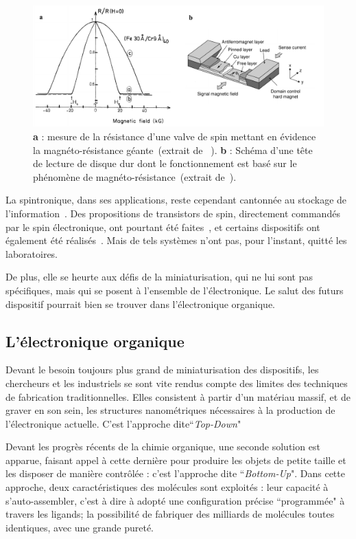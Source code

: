 \begin{figure}
\centering \includegraphics[scale=0.45]{Spintronique/SpinValve/SpinValve.pdf}
\caption{\textbf{a} : mesure de la résistance d'une valve de spin mettant en évidence la magnéto-résistance géante~(extrait de ~\cite{Baibich1988}).  \textbf{b} : Schéma d'une tête de lecture de disque dur dont le fonctionnement est basé sur le phénomène de magnéto-résistance~(extrait de~\cite{Hitoshi2001}).}
\label{SpinValve}
\end{figure}



La spintronique, dans ses applications, reste cependant cantonnée au stockage de  l'information~\cite{Awschalom2007}. Des propositions de transistors de spin, directement commandés par le spin électronique, ont pourtant été faites~\cite{Datta1990}, et certains dispositifs ont également été réalisés~\cite{Johnson1996,Huang2007}. Mais de tels systèmes n'ont pas, pour l'instant, quitté les laboratoires.

De plus, elle se heurte aux défis de la miniaturisation, qui ne lui sont pas spécifiques, mais qui se posent à l'ensemble de l'électronique. Le salut des futurs dispositif pourrait bien se trouver dans l'électronique organique.

\subsection{L'électronique organique}
Devant le besoin toujours plus grand de miniaturisation des dispositifs, les chercheurs et les industriels se sont vite rendus compte des limites des techniques de fabrication traditionnelles. Elles consistent à partir d'un matériau massif, et de graver en son sein, les structures nanométriques nécessaires à la production de l'électronique actuelle. C'est l'approche dite``\textit{Top-Down}"

Devant les progrès récents de la chimie organique, une seconde solution est apparue, faisant appel à cette dernière  pour produire les objets de petite taille et les disposer de manière contrôlée : c'est l'approche dite ``\textit{Bottom-Up}". Dans cette approche, deux caractéristiques des molécules sont exploités : leur capacité à s'auto-assembler, c'est à dire à adopté une configuration précise ``programmée" à travers les ligands; la possibilité de fabriquer des milliards de molécules toutes identiques, avec une grande pureté. 

